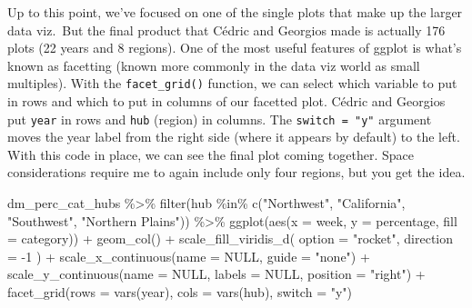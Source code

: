 \documentclass[
]{book}
\newenvironment{Shaded}{\begin{snugshade}}{\end{snugshade}}
\newcommand{\AttributeTok}[1]{\textcolor[rgb]{0.77,0.63,0.00}{#1}}
\newcommand{\ConstantTok}[1]{\textcolor[rgb]{0.00,0.00,0.00}{#1}}
\newcommand{\DecValTok}[1]{\textcolor[rgb]{0.00,0.00,0.81}{#1}}
\newcommand{\FunctionTok}[1]{\textcolor[rgb]{0.00,0.00,0.00}{#1}}
\newcommand{\NormalTok}[1]{#1}
\newcommand{\SpecialCharTok}[1]{\textcolor[rgb]{0.00,0.00,0.00}{#1}}
\newcommand{\StringTok}[1]{\textcolor[rgb]{0.31,0.60,0.02}{#1}}
\begin{document}
Up to this point, we've focused on one of the single plots that make up the larger data viz.~But the final product that Cédric and Georgios made is actually 176 plots (22 years and 8 regions). One of the most useful features of ggplot is what's known as facetting (known more commonly in the data viz world as small multiples). With the \texttt{facet\_grid()} function, we can select which variable to put in rows and which to put in columns of our facetted plot. Cédric and Georgios put \texttt{year} in rows and \texttt{hub} (region) in columns. The \texttt{switch\ =\ "y"} argument moves the year label from the right side (where it appears by default) to the left. With this code in place, we can see the final plot coming together. Space considerations require me to again include only four regions, but you get the idea.

\begin{Shaded}
\begin{Highlighting}[]
\NormalTok{dm\_perc\_cat\_hubs }\SpecialCharTok{\%\textgreater{}\%}
  \FunctionTok{filter}\NormalTok{(hub }\SpecialCharTok{\%in\%} \FunctionTok{c}\NormalTok{(}\StringTok{"Northwest"}\NormalTok{, }
                    \StringTok{"California"}\NormalTok{, }
                    \StringTok{"Southwest"}\NormalTok{, }
                    \StringTok{"Northern Plains"}\NormalTok{)) }\SpecialCharTok{\%\textgreater{}\%}
  \FunctionTok{ggplot}\NormalTok{(}\FunctionTok{aes}\NormalTok{(}\AttributeTok{x =}\NormalTok{ week, }
             \AttributeTok{y =}\NormalTok{ percentage,}
             \AttributeTok{fill =}\NormalTok{ category)) }\SpecialCharTok{+}
  \FunctionTok{geom\_col}\NormalTok{() }\SpecialCharTok{+}
  \FunctionTok{scale\_fill\_viridis\_d}\NormalTok{(}
    \AttributeTok{option =} \StringTok{"rocket"}\NormalTok{,}
    \AttributeTok{direction =} \SpecialCharTok{{-}}\DecValTok{1}
\NormalTok{  ) }\SpecialCharTok{+}
  \FunctionTok{scale\_x\_continuous}\NormalTok{(}\AttributeTok{name =} \ConstantTok{NULL}\NormalTok{, }
                     \AttributeTok{guide =} \StringTok{"none"}\NormalTok{) }\SpecialCharTok{+}
  \FunctionTok{scale\_y\_continuous}\NormalTok{(}\AttributeTok{name =} \ConstantTok{NULL}\NormalTok{, }
                     \AttributeTok{labels =} \ConstantTok{NULL}\NormalTok{, }
                     \AttributeTok{position =} \StringTok{"right"}\NormalTok{) }\SpecialCharTok{+}
  \FunctionTok{facet\_grid}\NormalTok{(}\AttributeTok{rows =} \FunctionTok{vars}\NormalTok{(year), }
             \AttributeTok{cols =} \FunctionTok{vars}\NormalTok{(hub), }
             \AttributeTok{switch =} \StringTok{"y"}\NormalTok{)}
\end{Highlighting}
\end{Shaded}
\end{document}
